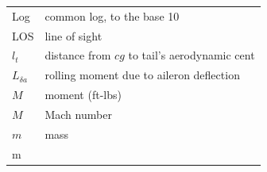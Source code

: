 \documentclass[
]{book}
\begin{document}
\begin{longtable}[]{@{}ll@{}}
\begin{minipage}[t]{0.47\columnwidth}
Log\strut
\end{minipage} & \begin{minipage}[t]{0.47\columnwidth}\raggedright
common log, to the base 10\strut
\end{minipage}\tabularnewline
\begin{minipage}[t]{0.47\columnwidth}\raggedright
LOS\strut
\end{minipage} & \begin{minipage}[t]{0.47\columnwidth}\raggedright
line of sight\strut
\end{minipage}\tabularnewline
\begin{minipage}[t]{0.47\columnwidth}\raggedright
\(l_t\)\strut
\end{minipage} & \begin{minipage}[t]{0.47\columnwidth}\raggedright
distance from \(cg\) to tail's aerodynamic cent\strut
\end{minipage}\tabularnewline
\begin{minipage}[t]{0.47\columnwidth}\raggedright
\(L_{\delta a}\)\strut
\end{minipage} & \begin{minipage}[t]{0.47\columnwidth}\raggedright
rolling moment due to aileron deflection\strut
\end{minipage}\tabularnewline
\begin{minipage}[t]{0.47\columnwidth}\raggedright
\(M\)\strut
\end{minipage} & \begin{minipage}[t]{0.47\columnwidth}\raggedright
moment (ft-lbs)\strut
\end{minipage}\tabularnewline
\begin{minipage}[t]{0.47\columnwidth}\raggedright
\(M\)\strut
\end{minipage} & \begin{minipage}[t]{0.47\columnwidth}\raggedright
Mach number\strut
\end{minipage}\tabularnewline
\begin{minipage}[t]{0.47\columnwidth}\raggedright
\(m\)\strut
\end{minipage} & \begin{minipage}[t]{0.47\columnwidth}\raggedright
mass\strut
\end{minipage}\tabularnewline
\begin{minipage}[t]{0.47\columnwidth}\raggedright
m\strut
\end{minipage} & \begin{minipage}[t]{0.47\columnwidth}\raggedright

\end{minipage}
\end{longtable}
\end{document}
